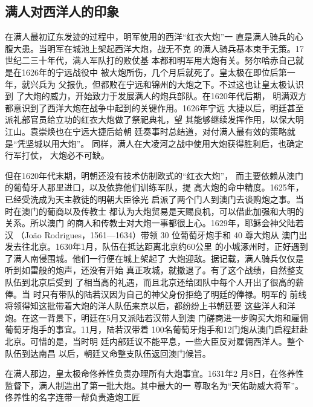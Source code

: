 \subsection{满人对西洋人的印象}
\par
在满人最初辽东发迹的过程中，明军使用的西洋“红衣大炮”一%
直是满人骑兵的心腹大患。当明军在城池上架起西洋大炮，战无不克%
的满人骑兵基本束手无策。17世纪二三十年代，满人军队打的败仗基%
本都和明军用大炮有关。努尔哈赤自己就是在1626年的宁远战役中%
被大炮所伤，几个月后就死了。皇太极在即位后第一年，就兴兵为%
父报仇，但都败在宁远和锦州的大炮之下。不过这也让皇太极认识到%
了大炮的威力，开始致力于发展满人的炮兵部队。在1620年代后期，%
明满双方都意识到了西洋大炮在战争中起到的关键作用。1626年宁远%
大捷以后，明廷甚至派礼部官员给立功的红衣大炮做了祭祀典礼，望%
其能够继续发挥作用，以保大明江山。袁崇焕也在宁远大捷后给朝%
廷奏事时总结道，对付满人最有效的策略就是“凭坚城以用大炮”。%
同样，满人在大凌河之战中使用大炮获得胜利后，也确定行军打仗，%
大炮必不可缺。%
\par
但在1620年代末期，明朝还没有技术仿制欧式的“红衣大炮”，%
而主要依赖从澳门的葡萄牙人那里进口，以及依靠他们训练军队，提%
高大炮的命中精度。1625年，已经受洗成为天主教徒的明朝大臣徐光%
启派了两个门人到澳门去谈购炮之事。当时在澳门的葡商以及传教士%
都认为大炮贸易是天赐良机，可以借此加强和大明的关系。所以澳门%
的商人和传教士对大炮一事都很上心。1629年，耶稣会神父陆若汉%
（João Rodrigues，1561—1634）带领 30 位葡萄牙炮手和 40 尊大炮从%
澳门出发去往北京。1630年1月，队伍在抵达距离北京约60公里%
的小城涿州时，正好遇到了满人南侵围城。他们一行便在城上架起了%
大炮迎敌。据记载，满人骑兵仅仅是听到如雷般的炮声，还没有开始%
真正攻城，就撤退了。有了这个战绩，自然整支队伍到北京后受到%
了相当高的礼遇，而且北京还给团队中每个人开出了很高的薪俸。当%
时只有带队的陆若汉因为自己的神父身份拒绝了明廷的俸禄。明军的%
前线将领得知这批带着大炮的洋人队伍来京以后，都纷纷上书朝廷要%
这些洋人和洋炮。在这一背景下，明廷在5月又派陆若汉带人到澳%
门磋商进一步购买大炮和雇佣葡萄牙炮手的事宜。11月，陆若汉带着%
100名葡萄牙炮手和12门炮从澳门启程赶赴北京。可惜的是，当时明%
廷内部廷议不能平息，一些大臣反对雇佣西洋人。整个队伍到达南昌%
以后，朝廷又命整支队伍返回澳门候旨。%
\par
在满人那边，皇太极命佟养性负责办理所有大炮事宜。1631年2%
月8日，在佟养性监督下，满人制造出了第一批大炮。其中最大的一%
尊取名为“天佑助威大将军”。佟养性的名字连带一帮负责造炮工匠%
